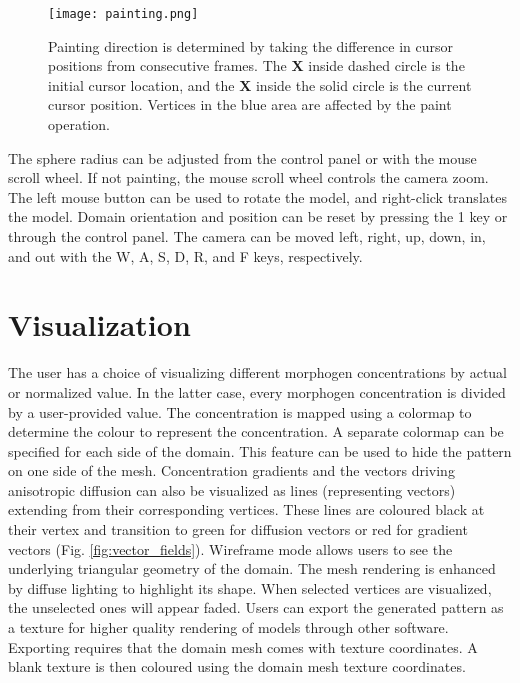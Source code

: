 \begin{figure}[ht]
	\centering
	\texttt{[image: painting.png]}	
	\caption[Painting direction is determined by taking the difference in cursor positions from consecutive frames]{Painting direction is determined by taking the difference in cursor positions from consecutive frames. The \textbf{X} inside dashed circle is the initial cursor location, and the \textbf{X} inside the solid circle is the current cursor position. Vertices in the blue area are affected by the paint operation.} 
	\label{fig:painting}
\end{figure}

The sphere radius can be adjusted from the control panel or with the mouse scroll wheel. If not painting, the mouse scroll wheel controls the camera zoom. The left mouse button can be used to rotate the model, and right-click translates the model. Domain orientation and position can be reset by pressing the 1 key or through the control panel. The camera can be moved left, right, up, down, in, and out with the W, A, S, D, R, and F keys, respectively.

\section{Visualization}
The user has a choice of visualizing different morphogen concentrations by actual or normalized value. In the latter case, every morphogen concentration is divided by a user-provided value. The concentration is mapped using a colormap to determine the colour to represent the concentration. A separate colormap can be specified for each side of the domain. This feature can be used to hide the pattern on one side of the mesh. Concentration gradients and the vectors driving anisotropic diffusion can also be visualized as lines (representing vectors) extending from their corresponding vertices. These lines are coloured black at their vertex and transition to green for diffusion vectors or red for gradient vectors (Fig. \ref{fig:vector_fields}). Wireframe mode allows users to see the underlying triangular geometry of the domain. The mesh rendering is enhanced by diffuse lighting to highlight its shape. When selected vertices are visualized, the unselected ones will appear faded. Users can export the generated pattern as a texture for higher quality rendering of models through other software. Exporting requires that the domain mesh comes with texture coordinates. A blank texture is then coloured using the domain mesh texture coordinates.

